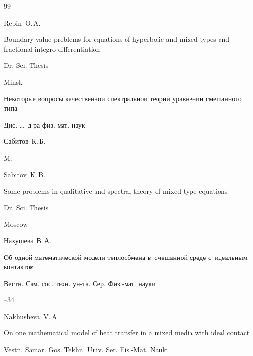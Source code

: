 \begin{thebibliography}{99}
\misctransl

\by Repin~O.\,A.

\thesis Boundary value problems for equations of hyperbolic and mixed types and fractional integro-differentiation

\thesisinfo Dr. Sci. Thesis

\publaddr Minsk










\thesis Некоторые вопросы качественной спектральной теории уравнений смешанного типа

\thesisinfo Дис. \dots\ д-ра физ.-мат. наук

\by Сабитов~К.\,Б.

\publaddr M.



\misctransl

\by Sabitov~K.\,B.

\thesis Some problems in qualitative and spectral theory of mixed-type equations 

\thesisinfo Dr. Sci. Thesis

\publaddr Moscow 








\by Нахушева~В.\,А.

\paper Об одной математической модели теплообмена в~смешанной среде с~идеальным контактом

\jour  Вестн. Сам. гос. техн. ун-та. Сер. Физ.-мат. науки



--34

\misctransl

\by Nakhusheva~V.\,A.

\paper On one mathematical model of heat transfer in a mixed media with ideal contact

\jour Vestn. Samar. Gos. Tekhn. Univ. Ser. Fiz.-Mat. Nauki




\end{thebibliography}
